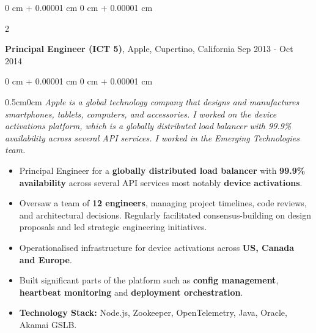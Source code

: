 \documentclass[10pt, letterpaper]{article}
\newenvironment{highlights}{
    \begin{itemize}[
        topsep=0.10 cm,
        parsep=0.10 cm,
        partopsep=0pt,
        itemsep=0pt,
        leftmargin=0 cm + 10pt
    ]
}{
    \end{itemize}
} %
\newenvironment{onecolentry}{
    \begin{adjustwidth}{
        0 cm + 0.00001 cm
    }{
        0 cm + 0.00001 cm
    }
}{
    \end{adjustwidth}
} %
\newenvironment{twocolentry}[2][]{
    \onecolentry
    \def\secondColumn{#2}
    \setcolumnwidth{\fill, 4.5 cm}
    \begin{paracol}{2}
}{
    \switchcolumn \raggedleft \secondColumn
    \end{paracol}
    \endonecolentry
} %
\begin{document}
        \vspace{0.15 cm}
        \begin{twocolentry}{
            Sep 2013 - Oct 2014
        }
            \textbf{Principal Engineer (ICT 5)}, Apple, Cupertino, California\end{twocolentry}
        \vspace{0.10 cm}
        \begin{onecolentry}
            \begin{adjustwidth}{0.5cm}{0cm}
            \textit{Apple is a global technology company that designs and manufactures smartphones, tablets, computers, and accessories. I worked on the device activations platform, which is a globally distributed load balancer with 99.9\% availability across several API services. I worked in the Emerging Technologies team.}
            \end{adjustwidth}

            \vspace{0.10 cm}
            \begin{highlights}
                \item Principal Engineer for a \textbf{globally distributed load balancer} with \textbf{99.9\% availability} across several API services most notably \textbf{device activations}.
                \item Oversaw a team of \textbf{12 engineers}, managing project timelines, code reviews, and architectural decisions. Regularly facilitated consensus-building on design proposals and led strategic engineering initiatives.
                \item Operationalised infrastructure for device activations across \textbf{US, Canada and Europe}.
                \item Built significant parts of the platform such as \textbf{config management}, \textbf{heartbeat monitoring} and \textbf{deployment orchestration}.
                \item \textbf{Technology Stack:} Node.js, Zookeeper, OpenTelemetry, Java, Oracle, Akamai GSLB.
            \end{highlights}
        \end{onecolentry}
\end{document}
